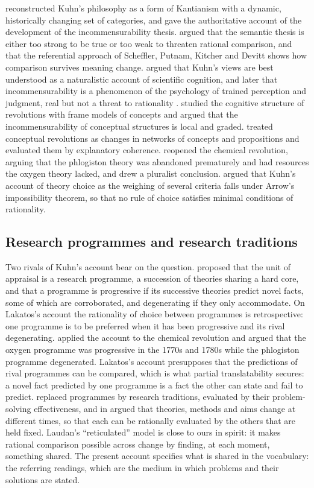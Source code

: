 \documentclass{situationist-preprint}
\begin{document}
\citet{HoyningenHuene1993} reconstructed Kuhn's philosophy as a form of Kantianism with a dynamic, historically changing set of categories, and gave the authoritative account of the development of the incommensurability thesis. \citet{Sankey1994,Sankey1997} argued that the semantic thesis is either too strong to be true or too weak to threaten rational comparison, and that the referential approach of Scheffler, Putnam, Kitcher and Devitt shows how comparison survives meaning change. \citet{Bird2000} argued that Kuhn's views are best understood as a naturalistic account of scientific cognition, and later that incommensurability is a phenomenon of the psychology of trained perception and judgment, real but not a threat to rationality \citep{Bird2008}. \citet{AndersenBarkerChen2006} studied the cognitive structure of revolutions with frame models of concepts and argued that the incommensurability of conceptual structures is local and graded. \citet{Thagard1992} treated conceptual revolutions as changes in networks of concepts and propositions and evaluated them by explanatory coherence. \citet{Chang2012} reopened the chemical revolution, arguing that the phlogiston theory was abandoned prematurely and had resources the oxygen theory lacked, and drew a pluralist conclusion. \citet{Okasha2011} argued that Kuhn's account of theory choice as the weighing of several criteria falls under Arrow's impossibility theorem, so that no rule of choice satisfies minimal conditions of rationality.

\subsection{Research programmes and research traditions}

Two rivals of Kuhn's account bear on the question. \citet{Lakatos1970} proposed that the unit of appraisal is a research programme, a succession of theories sharing a hard core, and that a programme is progressive if its successive theories predict novel facts, some of which are corroborated, and degenerating if they only accommodate. On Lakatos's account the rationality of choice between programmes is retrospective: one programme is to be preferred when it has been progressive and its rival degenerating. \citet{Musgrave1976} applied the account to the chemical revolution and argued that the oxygen programme was progressive in the 1770s and 1780s while the phlogiston programme degenerated. Lakatos's account presupposes that the predictions of rival programmes can be compared, which is what partial translatability secures: a novel fact predicted by one programme is a fact the other can state and fail to predict. \citet{Laudan1977} replaced programmes by research traditions, evaluated by their problem-solving effectiveness, and in \citet{Laudan1984} argued that theories, methods and aims change at different times, so that each can be rationally evaluated by the others that are held fixed. Laudan's \enquote{reticulated} model is close to ours in spirit: it makes rational comparison possible across change by finding, at each moment, something shared. The present account specifies what is shared in the vocabulary: the referring readings, which are the medium in which problems and their solutions are stated.
\end{document}
